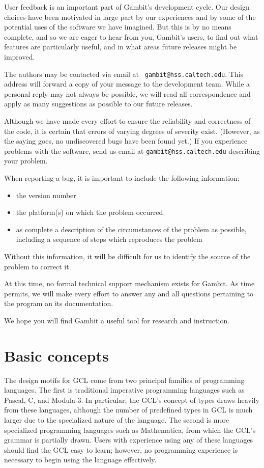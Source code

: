 User feedback is an important part of Gambit's development cycle.  Our
design choices have been motivated in large part by our experiences
and by some of the potential uses of the software we have imagined.
But this is by no means complete, and so we are eager to hear from
you, Gambit's users, to find out what features are particularly
useful, and in what areas future releases might be improved.

The authors may be contacted via email at {\tt
gambit@hss.caltech.edu}.  This address will forward a copy of your
message to the development team.  While a personal reply may not
always be possible, we will read all correspondence and apply as many
suggestions as possible to our future releases.

Although we have made every effort to ensure the reliability and
correctness of the code, it is certain that errors of varying degrees
of severity exist.  (However, as the saying goes, no undiscovered bugs
have been found yet.)  If you experience problems with the software,
send us email at {\tt gambit@hss.caltech.edu} describing your problem.

When reporting a bug, it is important to include the following
information:

\begin{itemize}
\item the version number
\item the platform(s) on which the problem occurred
\item as complete a description of the circumstances of the problem as possible, including a sequence of steps which reproduces the problem
\end{itemize}
 
\noindent Without this information, it will be difficult for us to
identify the source of the problem to correct it.

At this time, no formal technical support mechanism exists for Gambit.
As time permits, we will make every effort to answer any and all
questions pertaining to the program an its documentation.

We hope you will find Gambit a useful tool for research and
instruction.


\section{Basic concepts}

The design motifs for GCL come from two principal families of
programming languages.  The first is traditional imperative
programming languages such as Pascal, C, and Modula-3.  In particular,
the GCL's concept of types draws heavily from these languages,
although the number of predefined types in GCL is much larger due to
the specialized nature of the language.  The second is more
specialized programming languages such as Mathematica, from which the
GCL's grammar is partially drawn.  Users with experience using any of
these languages should find the GCL easy to learn; however, no
programming experience is necessary to begin using the language
effectively.

